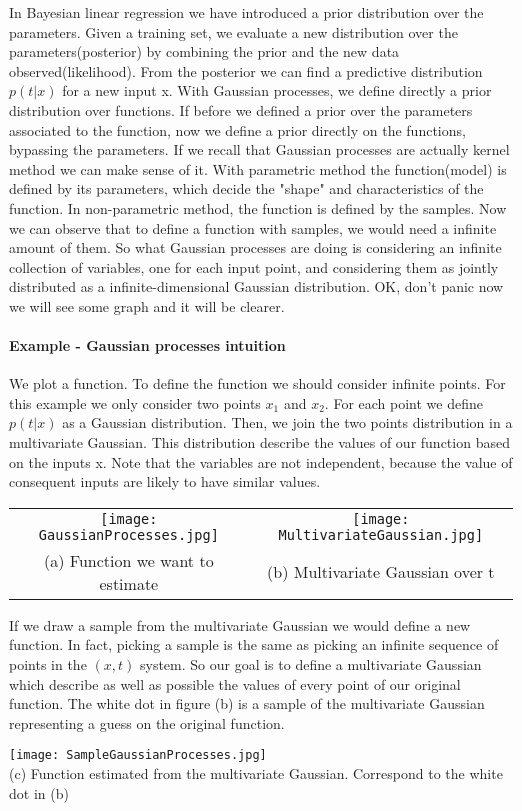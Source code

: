 \documentclass[main.tex]{subfiles}
\begin{document}
In Bayesian linear regression we have introduced a prior distribution over the parameters. Given a training set, we evaluate a new distribution over the parameters(posterior) by combining the prior and the new data observed(likelihood). From the posterior we can find a predictive distribution $p(t|x)$ for a new input x. With Gaussian processes, we define directly a prior distribution over functions\footnotemark. 
If before we defined a prior over the parameters associated to the function, now we define a prior directly on the functions, bypassing the parameters.
If we recall that Gaussian processes are actually kernel method we can make sense of it.
With parametric method the function(model) is defined by its parameters, which decide the "shape" and characteristics of the function.
In non-parametric method, the function is defined by the samples. Now we can observe that to define a function with samples, we would need a infinite amount of them. So what Gaussian processes are doing is considering an infinite collection of variables, one for each input point, and considering them as jointly distributed as a infinite-dimensional Gaussian distribution. OK, don't panic now we will see some graph and it will be clearer.
\paragraph{Example - Gaussian processes intuition}
We plot a function. To define the function we should consider infinite points. For this example we only consider two points $x_1$ and $x_2$. For each point we define $p(t|x)$ as a Gaussian distribution. Then, we join the two points distribution in a multivariate Gaussian. 
This distribution describe the values of our function based on the inputs x. Note that the variables are not independent, because the value of consequent inputs are likely to have similar values.
\newpage
\begin{center}
\begin{tabular}{cc}
    \texttt{[image: GaussianProcesses.jpg]} &
    \texttt{[image: MultivariateGaussian.jpg]} \\
(a) Function we want to estimate & (b) Multivariate Gaussian over t
\end{tabular}
\end{center}
If we draw a sample from the multivariate Gaussian we would define a new function. In fact, picking a sample is the same as picking an infinite sequence of points in the $(x,t)$ system. So our goal is to define a multivariate Gaussian which describe as well as possible the values of every point of our original function. The white dot in figure (b) is a sample of the multivariate Gaussian representing a guess on the original function.
\begin{center}
    \texttt{[image: SampleGaussianProcesses.jpg]} \\
    (c) Function estimated from the multivariate Gaussian. Correspond to the white dot in (b)
\end{center}
\end{document}
